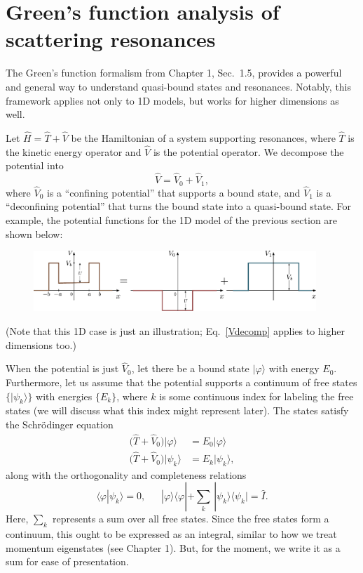 \documentclass[prx,12pt]{revtex4-2}
\begin{document}
\section{Green's function analysis of scattering resonances}
\label{sec:green_resonances}

The Green's function formalism from Chapter 1, Sec.~1.5, provides a
powerful and general way to understand quasi-bound states and
resonances.  Notably, this framework applies not only to 1D models,
but works for higher dimensions as well.

Let $\hat{H} = \hat{T} + \hat{V}$ be the Hamiltonian of a system
supporting resonances, where $\hat{T}$ is the kinetic energy operator
and $\hat{V}$ is the potential operator.  We decompose the potential
into
\begin{equation}
  \hat{V} = \hat{V}_0 + \hat{V}_1,
  \label{Vdecomp}
\end{equation}
where $\hat{V}_0$ is a ``confining potential'' that supports a bound
state, and $\hat{V}_1$ is a ``deconfining potential'' that turns the
bound state into a quasi-bound state.  For example, the potential
functions for the 1D model of the previous section are shown below:

\begin{figure}[h]
  \centering\includegraphics[width=0.95\textwidth]{resonancewell_decomp}
\end{figure}

\noindent
(Note that this 1D case is just an illustration; Eq.~\eqref{Vdecomp}
applies to higher dimensions too.)

When the potential is just $\hat{V}_0$, let there be a bound state
$|\varphi\rangle$ with energy $E_0$.  Furthermore, let us assume that
the potential supports a continuum of free states $\{|\psi_k\rangle\}$
with energies $\{E_k\}$, where $k$ is some continuous index for
labeling the free states (we will discuss what this index might
represent later).  The states satisfy the Schr\"odinger equation
\begin{align}
  \big(\hat{T} + \hat{V}_0\big) |\varphi\rangle \; &= E_0 |\varphi\rangle \\ \big(\hat{T} + \hat{V}_0\big) |\psi_k\rangle &= E_k |\psi_k\rangle,
\end{align}
along with the orthogonality and completeness relations
\begin{equation}
  \langle\varphi|\psi_k\rangle = 0, \;\;\quad |\varphi\rangle\langle\varphi|
  + \sum_k \, |\psi_k\rangle\langle\psi_k| = \hat{I}.
\end{equation}
Here, $\sum_k$ represents a sum over all free states.  Since the free
states form a continuum, this ought to be expressed as an integral,
similar to how we treat momentum eigenstates (see Chapter 1).  But,
for the moment, we write it as a sum for ease of presentation.
\end{document}
